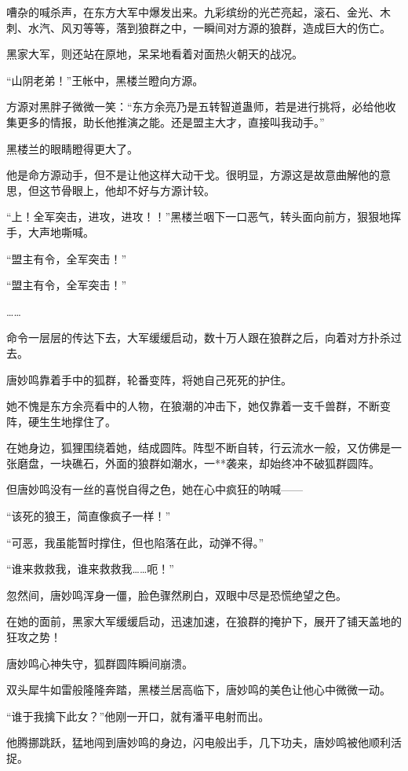 \begin{this_body}
嘈杂的喊杀声，在东方大军中爆发出来。九彩缤纷的光芒亮起，滚石、金光、木刺、水汽、风刃等等，落到狼群之中，一瞬间对方源的狼群，造成巨大的伤亡。

黑家大军，则还站在原地，呆呆地看着对面热火朝天的战况。

“山阴老弟！”王帐中，黑楼兰瞪向方源。

方源对黑胖子微微一笑：“东方余亮乃是五转智道蛊师，若是进行挑将，必给他收集更多的情报，助长他推演之能。还是盟主大才，直接叫我动手。”

黑楼兰的眼睛瞪得更大了。

他是命方源动手，但不是让他这样大动干戈。很明显，方源这是故意曲解他的意思，但这节骨眼上，他却不好与方源计较。

“上！全军突击，进攻，进攻！！”黑楼兰咽下一口恶气，转头面向前方，狠狠地挥手，大声地嘶喊。

“盟主有令，全军突击！”

“盟主有令，全军突击！”

……

命令一层层的传达下去，大军缓缓启动，数十万人跟在狼群之后，向着对方扑杀过去。

唐妙鸣靠着手中的狐群，轮番变阵，将她自己死死的护住。

她不愧是东方余亮看中的人物，在狼潮的冲击下，她仅靠着一支千兽群，不断变阵，硬生生地撑住了。

在她身边，狐狸围绕着她，结成圆阵。阵型不断自转，行云流水一般，又仿佛是一张磨盘，一块礁石，外面的狼群如潮水，一**袭来，却始终冲不破狐群圆阵。

但唐妙鸣没有一丝的喜悦自得之色，她在心中疯狂的呐喊——

“该死的狼王，简直像疯子一样！”

“可恶，我虽能暂时撑住，但也陷落在此，动弹不得。”

“谁来救救我，谁来救救我……呃！”

忽然间，唐妙鸣浑身一僵，脸色骤然刷白，双眼中尽是恐慌绝望之色。

在她的面前，黑家大军缓缓启动，迅速加速，在狼群的掩护下，展开了铺天盖地的狂攻之势！

唐妙鸣心神失守，狐群圆阵瞬间崩溃。

双头犀牛如雷般隆隆奔踏，黑楼兰居高临下，唐妙鸣的美色让他心中微微一动。

“谁于我擒下此女？”他刚一开口，就有潘平电射而出。

他腾挪跳跃，猛地闯到唐妙鸣的身边，闪电般出手，几下功夫，唐妙鸣被他顺利活捉。


\end{this_body}
